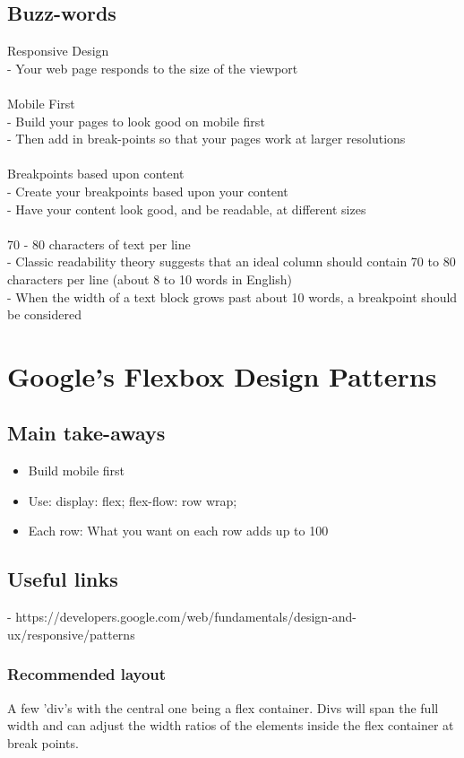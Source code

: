 \documentclass[]{article}
\newcommand{\<}{\guilsinglleft}
\renewcommand{\>}{\guilsinglright}
\begin{document}
\subsection{Buzz-words}
Responsive Design\\
 - Your web page responds to the size of the viewport\\
 \\
Mobile First\\
 - Build your pages to look good on mobile first\\
 - Then add in break-points so that your pages work at larger resolutions\\
 \\
Breakpoints based upon content\\
 - Create your breakpoints based upon your content\\
 - Have your content look good, and be readable, at different sizes\\
 \\
70 - 80 characters of text per line\\
 - Classic readability theory suggests that an ideal column should contain 70 to 80 characters per line (about 8 to 10 words in English)\\
 - When the width of a text block grows past about 10 words, a breakpoint should be considered\\
 
\section{Google's Flexbox Design Patterns}
\subsection{Main take-aways}
\begin{itemize}
	\item Build mobile first 
	\item Use: 
	\subitem display: flex; 
	\subitem flex-flow: row wrap; 
	\item Each row: 
	\subitem What you want on each row adds up to 100%
\end{itemize}
\subsection{Useful links}
 - https://developers.google.com/web/fundamentals/design-and-ux/responsive/patterns
 
 \subsubsection{Recommended layout}
 A few 'div's with the central one being a flex container.  Divs will span the full width and can adjust the width ratios of the elements inside the flex container at break points.
\end{document}
